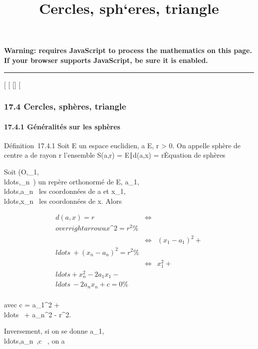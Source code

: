 \documentclass[]{article}
\title{Cercles, sph`eres, triangle}
\author{}
\date{}
\begin{document}
\maketitle

\textbf{Warning: 
requires JavaScript to process the mathematics on this page.\\ If your
browser supports JavaScript, be sure it is enabled.}

\begin{center}\rule{3in}{0.4pt}\end{center}

[
[
[]
[

\subsubsection{17.4 Cercles, sphères, triangle}

\paragraph{17.4.1 Généralités sur les sphères}

Définition~17.4.1 Soit E un espace euclidien, a \in E, r > 0.
On appelle sphère de centre a de rayon r l'ensemble S(a,r) =
\x \in E∣d(a,x) =
r\.

Equation de sphères

Soit
(O,\vece_1,\\ldots,\vece_n~)
un repère orthonormé de E,
a_1,\\ldots,a_n~
les coordonnées de a et
x_1,\\ldots,x_n~
les coordonnées de x. Alors

\begin{align*} d(a,x) = r&
\Leftrightarrow &
\\overrightarrowax\^2
= r^2 \%& \\ &
\Leftrightarrow & (x_1 -
a_1)^2 +
\\ldots~ +
(x_ n - a_n)^2 = r^2 \%&
\\ & \Leftrightarrow &
x_1^2 +
\\ldots + x_
n^2 - 2a_ 1x_1
-\\ldots~ -
2a_nx_n + c = 0\%& \\
\end{align*}

avec c = a_1^2 +
\\ldots~ +
a_n^2 - r^2.

Inversement, si on se donne
a_1,\\ldots,a_n~,c
\in {}~, on a
\end{document}
